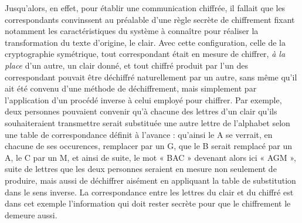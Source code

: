 Jusqu’alors, en effet, pour établir une communication chiffrée, il fallait que les correspondants
convinssent au préalable d’une règle secrète de chiffrement fixant notamment les caractéristiques du
système à connaître pour réaliser la transformation du texte d’origine, le clair.
Avec cette configuration, celle de la cryptographie symétrique, tout correspondant était en mesure
de chiffrer, \emph{à la place} d’un autre, un clair donné, et tout chiffré produit par l’un des
correspondant pouvait être déchiffré naturellement par un autre, sans même qu’il ait été convenu
d’une méthode de déchiffrement, mais simplement par l’application d’un procédé inverse à celui
employé pour chiffrer.
Par exemple, deux personnes pouvaient convenir qu’à chacune des lettres d’un clair qu’ils
souhaiteraient transmettre serait substituée une autre lettre de l’alphabet selon une table de
correspondance définit à l’avance : qu’ainsi le A se verrait, en chacune de ses occurences,
remplacer par un G, que le B serait remplacé par un A, le C par un M,
et ainsi de suite, le mot « BAC » devenant alors ici « AGM », suite
de lettres que les deux personnes seraient en mesure non seulement de produire, mais aussi de
déchiffrer aisément en appliquant la table de substitution dans le sens inverse.
La correspondance entre les lettres du clair et du chiffré est dans cet exemple l’information qui
doit rester secrète pour que le chiffrement le demeure aussi.


